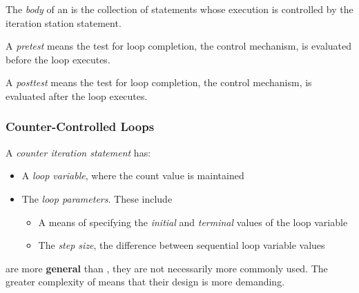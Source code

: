 \begin{definition}[Body]\label{def:Iterative_Statement-Body}
  The \emph{body} of an  is the collection of statements whose execution is controlled by the iteration station statement.
\end{definition}

\begin{definition}[Pretest]\label{def:Iterative_Statement-Pretest_Control}
  A \emph{pretest}  means the test for loop completion, the control mechanism, is evaluated before the loop  executes.
\end{definition}

\begin{definition}[Posttest]\label{def:Iterative_Statement-Posttest_Control}
  A \emph{posttest}  means the test for loop completion, the control mechanism, is evaluated after the loop  executes.
\end{definition}

\subsubsection{Counter-Controlled Loops}\label{subsubsec:Counter_Controlled_Loops}
\begin{definition}\label{def:Counter_Iteration_Statement}
  A \emph{counter iteration statement} has:
  \begin{itemize}[noitemsep]
  \item A \emph{loop variable}, where the count value is maintained
  \item The \emph{loop parameters}. These include
    \begin{itemize}[noitemsep]
    \item A means of specifying the \emph{initial} and \emph{terminal} values of the loop variable
    \item The \emph{step size}, the difference between sequential loop variable values
    \end{itemize}
  \end{itemize}
\end{definition}

 are more \textbf{general} than , they are not necessarily more commonly used.
The greater complexity of  means that their design is more demanding.

